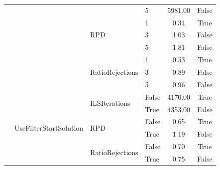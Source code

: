 \begin{table}[!ht]
\begin{tabular}{@{}l l l l c c @{}}
		                                      &                                              &                                     & 5                    & 5981.00         & False           \\\cmidrule(lr){3-6}
		                                      &                                              & \multirow[t]{3}{*}{RPD}             & 1                    & 0.34            & True            \\\cmidrule(lr){4-6}
		                                      &                                              &                                     & 3                    & 1.03            & False           \\\cmidrule(lr){4-6}
		                                      &                                              &                                     & 5                    & 1.81            & False           \\\cmidrule(lr){3-6}
		                                      &                                              & \multirow[t]{3}{*}{RatioRejections} & 1                    & 0.53            & True            \\\cmidrule(lr){4-6}
		                                      &                                              &                                     & 3                    & 0.89            & False           \\\cmidrule(lr){4-6}
		                                      &                                              &                                     & 5                    & 0.96            & False           \\\cmidrule(lr){2-6}
		                                      & \multirow[t]{6}{*}{UseFilterStartSolution}   & \multirow[t]{2}{*}{ILSIterations}   & False                & 4170.00         & True            \\\cmidrule(lr){4-6}
		                                      &                                              &                                     & True                 & 4353.00         & False           \\\cmidrule(lr){3-6}
		                                      &                                              & \multirow[t]{2}{*}{RPD}             & False                & 0.65            & True            \\\cmidrule(lr){4-6}
		                                      &                                              &                                     & True                 & 1.19            & False           \\\cmidrule(lr){3-6}
		                                      &                                              & \multirow[t]{2}{*}{RatioRejections} & False                & 0.70            & True            \\\cmidrule(lr){4-6}
		                                      &                                              &                                     & True                 & 0.75            & False           \\
	\end{tabular}


\end{table}
